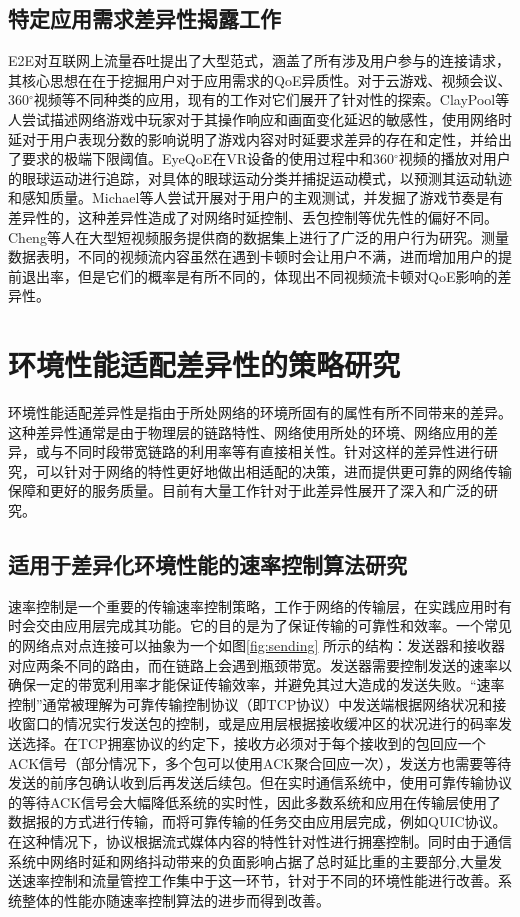 \subsection{特定应用需求差异性揭露工作}
E2E\cite{zhang2019e2e}对互联网上流量吞吐提出了大型范式，涵盖了所有涉及用户参与的连接请求，其核心思想在在于挖掘用户对于应用需求的QoE异质性。对于云游戏、视频会议、360$^{\circ}$视频等不同种类的应用，现有的工作对它们展开了针对性的探索。ClayPool等人尝试描述网络游戏中玩家对于其操作响应和画面变化延迟的敏感性\cite{claypool2006latency,claypool2010latency}，使用网络时延对于用户表现分数的影响说明了游戏内容对时延要求差异的存在和定性，并给出了要求的极端下限阈值。EyeQoE\cite{zhu2022eyeqoe}在VR设备的使用过程中和360$^{\circ}$视频的播放对用户的眼球运动进行追踪，对具体的眼球运动分类并捕捉运动模式，以预测其运动轨迹和感知质量。Michael等人尝试开展对于用户的主观测试\cite{jarschel2011evaluation}，并发掘了游戏节奏是有差异性的，这种差异性造成了对网络时延控制、丢包控制等优先性的偏好不同。Cheng等人在大型短视频服务提供商的数据集上进行了广泛的用户行为研究\cite{cheng2023rebuffering}。测量数据表明，不同的视频流内容虽然在遇到卡顿时会让用户不满，进而增加用户的提前退出率，但是它们的概率是有所不同的，体现出不同视频流卡顿对QoE影响的差异性。


\section{环境性能适配差异性的策略研究}
环境性能适配差异性是指由于所处网络的环境所固有的属性有所不同带来的差异。这种差异性通常是由于物理层的链路特性、网络使用所处的环境、网络应用的差异，或与不同时段带宽链路的利用率等有直接相关性。针对这样的差异性进行研究，可以针对于网络的特性更好地做出相适配的决策，进而提供更可靠的网络传输保障和更好的服务质量。目前有大量工作针对于此差异性展开了深入和广泛的研究。

\subsection{适用于差异化环境性能的速率控制算法研究}
速率控制是一个重要的传输速率控制策略，工作于网络的传输层，在实践应用时有时会交由应用层完成其功能。它的目的是为了保证传输的可靠性和效率。一个常见的网络点对点连接可以抽象为一个如图\ref{fig:sending} \cite{author2024performance}所示的结构：发送器和接收器对应两条不同的路由，而在链路上会遇到瓶颈带宽。发送器需要控制发送的速率以确保一定的带宽利用率才能保证传输效率，并避免其过大造成的发送失败。“速率控制”通常被理解为可靠传输控制协议（即TCP协议）中发送端根据网络状况和接收窗口的情况实行发送包的控制，或是应用层根据接收缓冲区的状况进行的码率发送选择。在TCP拥塞协议的约定下，接收方必须对于每个接收到的包回应一个ACK信号（部分情况下，多个包可以使用ACK聚合回应一次），发送方也需要等待发送的前序包确认收到后再发送后续包。但在实时通信系统中，使用可靠传输协议的等待ACK信号会大幅降低系统的实时性，因此多数系统和应用在传输层使用了数据报的方式进行传输，而将可靠传输的任务交由应用层完成，例如QUIC\cite{langley2017quic}协议。在这种情况下，协议根据流式媒体内容的特性针对性进行拥塞控制。同时由于通信系统中网络时延和网络抖动带来的负面影响占据了总时延比重的主要部分\cite{yuan2022understanding},大量发送速率控制和流量管控工作集中于这一环节，针对于不同的环境性能进行改善。系统整体的性能亦随速率控制算法的进步而得到改善。

